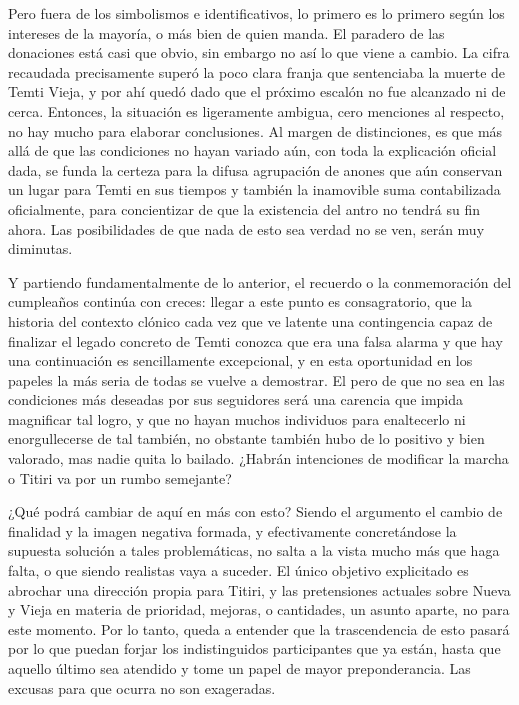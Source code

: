 \documentclass[
]{book}
\begin{document}
Pero fuera de los simbolismos e identificativos, lo primero es lo primero según los intereses de la mayoría, o más bien de quien manda. El paradero de las donaciones está casi que obvio, sin embargo no así lo que viene a cambio. La cifra recaudada precisamente superó la poco clara franja que sentenciaba la muerte de Temti Vieja, y por ahí quedó dado que el próximo escalón no fue alcanzado ni de cerca. Entonces, la situación es ligeramente ambigua, cero menciones al respecto, no hay mucho para elaborar conclusiones. Al margen de distinciones, es que más allá de que las condiciones no hayan variado aún, con toda la explicación oficial dada, se funda la certeza para la difusa agrupación de anones que aún conservan un lugar para Temti en sus tiempos y también la inamovible suma contabilizada oficialmente, para concientizar de que la existencia del antro no tendrá su fin ahora. Las posibilidades de que nada de esto sea verdad no se ven, serán muy diminutas.

Y partiendo fundamentalmente de lo anterior, el recuerdo o la conmemoración del cumpleaños continúa con creces: llegar a este punto es consagratorio, que la historia del contexto clónico cada vez que ve latente una contingencia capaz de finalizar el legado concreto de Temti conozca que era una falsa alarma y que hay una continuación es sencillamente excepcional, y en esta oportunidad en los papeles la más seria de todas se vuelve a demostrar. El pero de que no sea en las condiciones más deseadas por sus seguidores será una carencia que impida magnificar tal logro, y que no hayan muchos individuos para enaltecerlo ni enorgullecerse de tal también, no obstante también hubo de lo positivo y bien valorado, mas nadie quita lo bailado. ¿Habrán intenciones de modificar la marcha o Titiri va por un rumbo semejante?

¿Qué podrá cambiar de aquí en más con esto? Siendo el argumento el cambio de finalidad y la imagen negativa formada, y efectivamente concretándose la supuesta solución a tales problemáticas, no salta a la vista mucho más que haga falta, o que siendo realistas vaya a suceder. El único objetivo explicitado es abrochar una dirección propia para Titiri, y las pretensiones actuales sobre Nueva y Vieja en materia de prioridad, mejoras, o cantidades, un asunto aparte, no para este momento. Por lo tanto, queda a entender que la trascendencia de esto pasará por lo que puedan forjar los indistinguidos participantes que ya están, hasta que aquello último sea atendido y tome un papel de mayor preponderancia. Las excusas para que ocurra no son exageradas.
\end{document}

